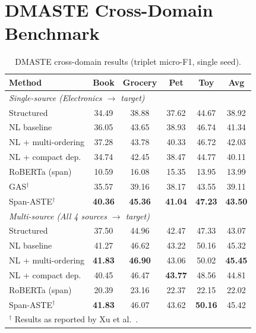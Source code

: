 \documentclass[12pt,a4paper]{report}
\begin{document}
\section{DMASTE Cross-Domain Benchmark}\label{sec:dmaste}

\begin{table}[H]
\centering
\caption{DMASTE cross-domain results (triplet micro-F1, single seed).}
\label{tab:dmaste}
\small
\begin{tabular}{@{}lccccc@{}}
\toprule
\textbf{Method} & \textbf{Book} & \textbf{Grocery} & \textbf{Pet} & \textbf{Toy} & \textbf{Avg} \\
\midrule
\multicolumn{6}{l}{\textit{Single-source (Electronics $\rightarrow$ target)}} \\
\midrule
Structured & 34.49 & 38.88 & 37.62 & 44.67 & 38.92 \\
NL baseline & 36.05 & 43.65 & 38.93 & 46.74 & 41.34 \\
NL + multi-ordering & 37.28 & 43.78 & 40.33 & 46.72 & 42.03 \\
NL + compact dep. & 34.74 & 42.45 & 38.47 & 44.77 & 40.11 \\
RoBERTa (span) & 10.59 & 16.08 & 15.35 & 13.95 & 13.99 \\
\midrule
GAS$^\dagger$~\cite{zhang2021towards} & 35.57 & 39.16 & 38.17 & 43.55 & 39.11 \\
Span-ASTE$^\dagger$~\cite{xu2021learning} & \textbf{40.36} & \textbf{45.36} & \textbf{41.04} & \textbf{47.23} & \textbf{43.50} \\
\midrule
\multicolumn{6}{l}{\textit{Multi-source (All 4 sources $\rightarrow$ target)}} \\
\midrule
Structured & 37.50 & 44.96 & 42.47 & 47.33 & 43.07 \\
NL baseline & 41.27 & 46.62 & 43.22 & 50.16 & 45.32 \\
NL + multi-ordering & \textbf{41.83} & \textbf{46.90} & 43.06 & 50.02 & \textbf{45.45} \\
NL + compact dep. & 40.45 & 46.47 & \textbf{43.77} & 48.56 & 44.81 \\
RoBERTa (span) & 20.39 & 23.16 & 22.37 & 22.15 & 22.02 \\
\midrule
Span-ASTE$^\dagger$~\cite{xu2021learning} & \textbf{41.83} & 46.07 & 43.62 & \textbf{50.16} & 45.42 \\
\bottomrule
\multicolumn{6}{l}{\small $^\dagger$ Results as reported by Xu et al.~\cite{xu2023dmaste}.}
\end{tabular}
\end{table}
\end{document}
